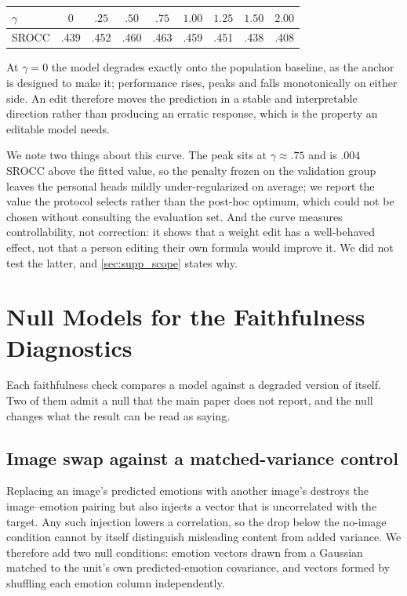 \begin{center}\small
\begin{tabular}{lcccccccc}
\toprule
$\gamma$ & $0$ & $.25$ & $.50$ & $.75$ & $1.00$ & $1.25$ & $1.50$ & $2.00$ \\
\midrule
SROCC & .439 & .452 & .460 & .463 & .459 & .451 & .438 & .408 \\
\bottomrule
\end{tabular}
\end{center}

At $\gamma=0$ the model degrades exactly onto the population baseline, as the
anchor is designed to make it; performance rises, peaks and falls monotonically
on either side. An edit therefore moves the prediction in a stable and
interpretable direction rather than producing an erratic response, which is the
property an editable model needs.

We note two things about this curve. The peak sits at $\gamma\approx.75$ and is
$.004$ SROCC above the fitted value, so the penalty frozen on the validation
group leaves the personal heads mildly under-regularized on average; we report
the value the protocol selects rather than the post-hoc optimum, which could
not be chosen without consulting the evaluation set. And the curve measures
controllability, not correction: it shows that a weight edit has a well-behaved
effect, not that a person editing their own formula would improve it. We did
not test the latter, and \cref{sec:supp_scope} states why.


\section{Null Models for the Faithfulness Diagnostics}
\label{sec:supp_nulls}

Each faithfulness check compares a model against a degraded version of itself.
Two of them admit a null that the main paper does not report, and the null
changes what the result can be read as saying.

\subsection{Image swap against a matched-variance control}

Replacing an image's predicted emotions with another image's destroys the
image--emotion pairing but also injects a vector that is uncorrelated with the
target. Any such injection lowers a correlation, so the drop below the
no-image condition cannot by itself distinguish misleading content from added
variance. We therefore add two null conditions: emotion vectors drawn from a
Gaussian matched to the unit's own predicted-emotion covariance, and vectors
formed by shuffling each emotion column independently.

